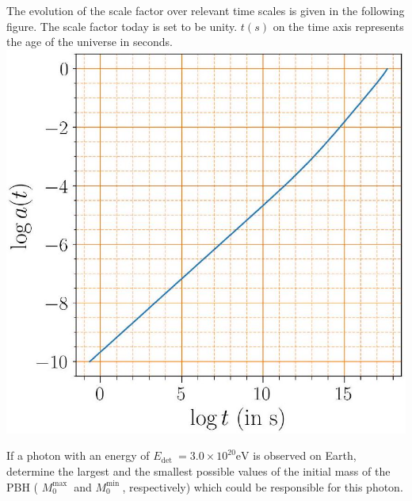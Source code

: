 \documentclass[10pt]{article}
\begin{document}
    The evolution of the scale factor over relevant time scales is given in the following figure. The scale factor today is set to be unity. $t(s)$ on the time axis represents the age of the universe in seconds.\\
    \includegraphics[max width=\textwidth, center]{2025_08_23_e94579452776a99c4850g-19}
    
    If a photon with an energy of $E_{\text {det }}=3.0 \times 10^{20} \mathrm{eV}$ is observed on Earth, determine the largest and the smallest possible values of the initial mass of the PBH ( $M_{0}^{\text {max }}$ and $M_{0}^{\text {min }}$, respectively) which could be responsible for this photon.
\end{document}
